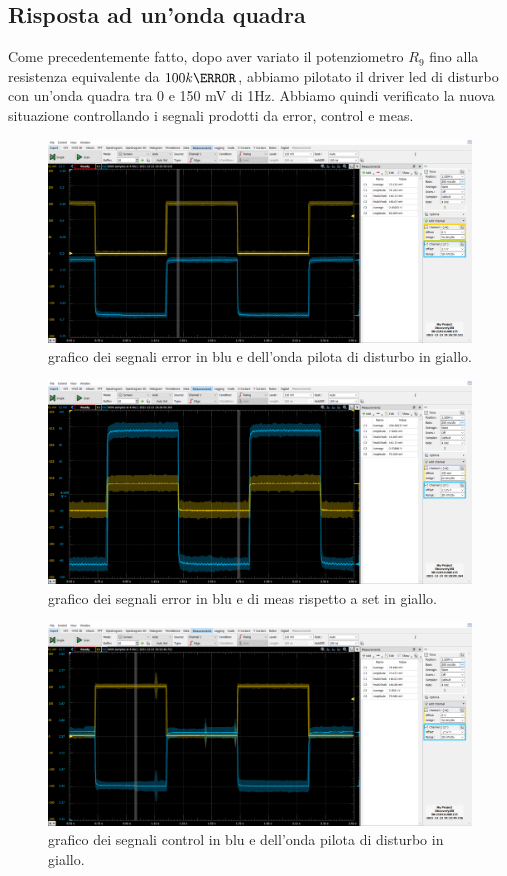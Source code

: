 \documentclass[10pt, a4paper, italian]{article}
\begin{document}
\subsection{Risposta ad un'onda quadra}
Come precedentemente fatto, dopo aver variato il potenziometro $R_9$ fino alla resistenza equivalente da $100 k\ohm$, abbiamo pilotato il driver led di disturbo con un'onda quadra tra 0 e 150 mV di 1Hz. Abbiamo quindi verificato la nuova situazione controllando i segnali prodotti da error, control e meas.
\begin{figure}[H]
    \centering
	\includegraphics[scale=0.7]{proportional}
    \caption{grafico dei segnali error in blu e dell'onda pilota di disturbo in giallo.
    \label{fig: Draft1}}
\end{figure}
\begin{figure}[H]
    \centering
	\includegraphics[scale=0.7]{proportional.meas}
    \caption{grafico dei segnali error in blu e di meas rispetto a set in giallo.
    \label{fig: Draft1}}
\end{figure}
\begin{figure}[H]
    \centering
	\includegraphics[scale=0.7]{proportional.control}
    \caption{grafico dei segnali control in blu e dell'onda pilota di disturbo in giallo.
    \label{fig: Draft1}}
\end{figure}
\end{document}
